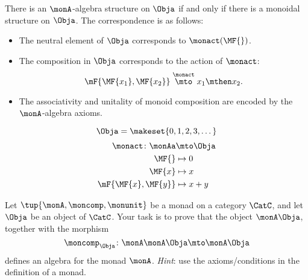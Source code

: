 \begin{proposition}\label{prop:monad-monoid}
    There is an $\monA$-algebra structure on $\Obja$ if and only if there
    is a monoidal structure on $\Obja$.
    The correspondence is as follows:
    \begin{itemize}
        \item The neutral element of $\Obja$ corresponds to $\monact(\MF{})$.
        \item The composition in $\Obja$ corresponds to the action of $\monact$:
              \begin{equation}
                  \mF{\MF{x_1}, \MF{x_2}} \stackrel{\monact}{\mto} x_1 \mthen x_2.
              \end{equation}
        \item The associativity and unitality of monoid composition are encoded by the $\monA$-algebra axioms.
    \end{itemize}
\end{proposition}
\begin{equation}\label{eq:addition-algebra-1}
    \Obja = \makeset{0, 1, 2, 3, \dots }
\end{equation}
\begin{equation}\label{eq:addition-algebra-2}
    \begin{aligned}
        \monact \colon \monAa & \mto \Obja \\
        \MF{}                 & \mapsto 0 \\
        \MF{x}                & \mapsto x \\
        \mF{\MF{x}, \MF{y}}   & \mapsto x + y
    \end{aligned}
\end{equation}

\begin{gradedexercise}
    \label{ex:HwkFreeAlgebras}
    Let $\tup{\monA, \moncomp, \monunit}$ be a monad on a category $\CatC$, and let $\Obja$ be an object of $\CatC$.
    Your task is to prove that the object $\monA \Obja$, together with the morphism
    \begin{equation}
        \moncomp_\Obja \colon \monA \monA \Obja \mto \monA \Obja
    \end{equation}
    defines an algebra for the monad $\monA$.
    \emph{Hint}: use the axioms/conditions in the definition of a monad.
\end{gradedexercise}
